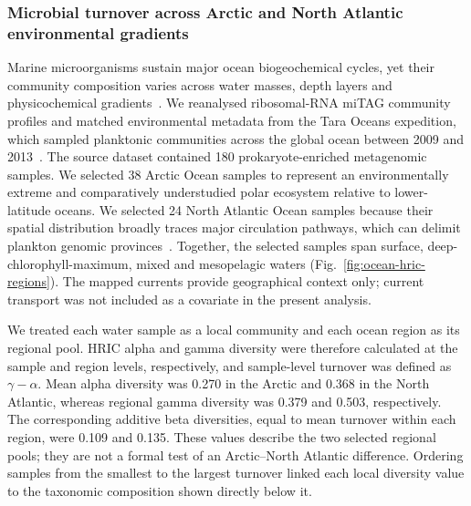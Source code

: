 \subsubsection{Microbial turnover across Arctic and North Atlantic environmental gradients}

Marine microorganisms sustain major ocean biogeochemical cycles, yet their
community composition varies across water masses, depth layers and
physicochemical gradients~\cite{sunagawa2015structure,salazar2019gene}. We
reanalysed ribosomal-RNA miTAG community profiles and matched environmental
metadata from the Tara Oceans expedition, which sampled planktonic communities
across the global ocean between 2009 and
2013~\cite{pesant2015open,salazar2019gene}. The source dataset contained 180
prokaryote-enriched metagenomic samples. We selected 38 Arctic Ocean samples
to represent an environmentally extreme and comparatively understudied polar
ecosystem relative to lower-latitude oceans. We selected 24 North Atlantic
Ocean samples because their spatial distribution broadly traces major
circulation pathways, which can delimit plankton genomic
provinces~\cite{richter2022currents}. Together, the selected samples span
surface, deep-chlorophyll-maximum, mixed and mesopelagic waters
(Fig.~\ref{fig:ocean-hric-regions}). The mapped currents provide geographical
context only; current transport was not included as a covariate in the present
analysis.

We treated each water sample as a local community and each ocean region as its
regional pool. HRIC alpha and gamma diversity were therefore calculated at the
sample and region levels, respectively, and sample-level turnover was defined
as $\gamma-\alpha$. Mean alpha diversity was 0.270 in the Arctic and 0.368 in
the North Atlantic, whereas regional gamma diversity was 0.379 and 0.503,
respectively. The corresponding additive beta diversities, equal to mean
turnover within each region, were 0.109 and 0.135. These values describe the
two selected regional pools; they are not a formal test of an Arctic--North
Atlantic difference. Ordering samples from the smallest to the largest
turnover linked each local diversity value to the taxonomic composition shown
directly below it.

